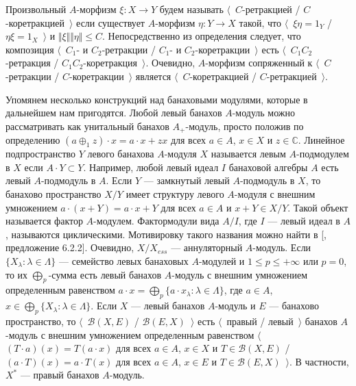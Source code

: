 Произвольный $A$-морфизм $\xi:X\to Y$ будем называть $\langle$~$C$-ретракцией / $C$-коретракцией~$\rangle$ если существует $A$-морфизм $\eta:Y\to X$ такой, что $\langle$~$\xi\eta=1_Y$ / $\eta\xi=1_X$~$\rangle$ и $\Vert\xi\Vert\Vert\eta\Vert\leq C$. Непосредственно из определения следует, что композиция $\langle$~$C_1$- и $C_2$-ретракции / $C_1$- и $C_2$-коретракции~$\rangle$ есть $\langle$~$C_1C_2$-ретракция / $C_1C_2$-коретракция~$\rangle$. Очевидно, $A$-морфизм сопряженный к $\langle$~$C$-ретракции / $C$-коретракции~$\rangle$ является $\langle$~$C$-коретракцией / $C$-ретракцией~$\rangle$.

Упомянем несколько конструкций над банаховыми модулями, которые в дальнейшем нам пригодятся. Любой левый банахов $A$-модуль можно рассматривать как унитальный банахов $A_+$-модуль, просто положив по определению $(a\oplus_1 z)\cdot x=a\cdot x+zx$ для всех $a\in A$, $x\in X$ и $z\in\mathbb{C}$. Линейное подпространство $ Y$ левого банахова $A$-модуля $X$ называется левым $A$-подмодулем в $X$ если $A\cdot Y\subset Y$. Например, любой левый идеал $I$ банаховой алгебры $A$ есть левый $A$-подмодуль в $A$. Если $Y$ --- замкнутый левый $A$-подмодуль в $X$, то банахово пространство $X/Y$ имеет структуру левого $A$-модуля с внешним умножением $a\cdot(x+Y)=a\cdot x+Y$ для всех $a\in A$ и $x+Y\in X/Y$. Такой объект называется фактор $A$-модулем. Фактормодули вида $A/I$, где $I$ --- левый идеал в $A$, называются циклическими. Мотивировку такого названия можно найти в [\cite{HelBanLocConvAlg}, предложение 6.2.2]. Очевидно, $X/X_{ess}$ --- аннуляторный $A$-модуль. Если $\{X_\lambda:\lambda\in\Lambda\}$ --- семейство левых банаховых $A$-модулей и $1\leq p\leq +\infty$ или $p=0$, то их $\bigoplus_p$-сумма есть левый банахов $A$-модуль с внешним умножением определенным равенством $a\cdot x=\bigoplus_p\{ a\cdot x_\lambda:\lambda\in\Lambda\}$, где $a\in A$, $x\in\bigoplus_p\{ X_\lambda:\lambda\in\Lambda\}$. Если $X$ --- левый банахов $A$-модуль и $E$ --- банахово пространство, то $\langle$~$\mathcal{B}(X,E)$ / $\mathcal{B}(E,X)$~$\rangle$ есть $\langle$~правый / левый~$\rangle$ банахов $A$-модуль с внешним умножением определенным равенством $\langle$~$(T\cdot a)(x)=T(a\cdot x)$ для всех $a\in A$, $x\in X$ и $T\in\mathcal{B}(X, E)$ / $(a\cdot T)(x)=a\cdot T(x)$ для всех $a\in A$, $x\in E$ и $T\in\mathcal{B}(E, X)$~$\rangle$. В частности, $X^*$  --- правый банахов $A$-модуль.

